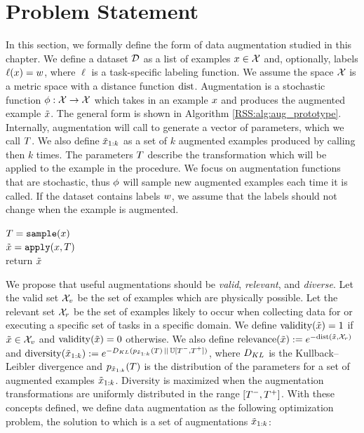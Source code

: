 \section{Problem Statement}  \label{RSS:sec:problem}

In this section, we formally define the form of data augmentation studied in this chapter. We define a dataset $\mathcal{D}$ as a list of examples $x\in\mathcal{X}$ and, optionally, labels $\ell(x)=w$, where $\ell$ is a task-specific labeling function. We assume the space $\mathcal{X}$ is a metric space with a distance function $\mathrm{dist}$. Augmentation is a stochastic function $\phi:\mathcal{X}\rightarrow\mathcal{X}$ which takes in an example $x$ and produces the augmented example $\Tilde{x}$. The general form is shown in Algorithm \ref{RSS:alg:aug_prototype}. Internally, augmentation will call \sample{} to generate a vector of parameters, which we call $T$. We also define $\Tilde{x}_{1:k}$ as a set of $k$ augmented examples produced by calling \sample{} then \apply{} $k$ times. The parameters $T$ describe the transformation which will be applied to the example in the \apply{} procedure. We focus on augmentation functions that are stochastic, thus $\phi$ will sample new augmented examples each time it is called. If the dataset contains labels $w$, we assume that the labels should not change when the example is augmented.

\begin{algorithm}[t]
\caption{$\augf(x)$}\label{RSS:alg:aug_prototype}
$T = \texttt{sample}{}(x) $\\
$\Tilde{x} = \texttt{apply}(x,T)$\\
return $\Tilde{x}$\\
\end{algorithm}

We propose that useful augmentations should be \textit{valid}, \textit{relevant}, and \textit{diverse}. Let the valid set $\mathcal{X}_v$ be the set of examples which are physically possible. Let the relevant set $\mathcal{X}_r$ be the set of examples likely to occur when collecting data for or executing a specific set of tasks in a specific domain. We define $\mathrm{validity}(\Tilde{x})=1$ if $\Tilde{x} \in \mathcal{X}_v$ and $\mathrm{validity}(\Tilde{x})=0$ otherwise. We also define $\mathrm{relevance}(\Tilde{x}):=e^{-\mathrm{dist}(\Tilde{x},\mathcal{X}_r)}$ and $\mathrm{diversity}(\Tilde{x}_{1:k}):=e^{-D_{KL}({p_{\Tilde{x}_{1:k}}(T)}\,||\,{\mathbb{U}[T^-,T^+]})}$, where $D_{KL}$ is the Kullback–Leibler divergence and $p_{\Tilde{x}_{1:k}}(T)$ is the distribution of the parameters for a set of augmented examples $\Tilde{x}_{1:k}$. Diversity is maximized when the augmentation transformations are uniformly distributed in the range $[T^-,T^+]$. With these concepts defined, we define data augmentation as the following optimization problem, the solution to which is a set of augmentations $\Tilde{x}_{1:k}$:

